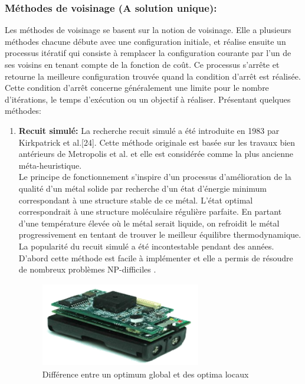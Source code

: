 \subsubsection{Méthodes de voisinage (A solution unique):}
Les méthodes de voisinage se basent sur la notion de voisinage. Elle a plusieurs méthodes chacune débute avec une configuration initiale, et réalise ensuite un processus itératif qui consiste à remplacer la configuration courante par l'un de ses voisins en tenant compte de la fonction de coût. Ce processus s'arrête et retourne la meilleure configuration trouvée quand la condition d'arrêt est réalisée. Cette condition d'arrêt concerne généralement une limite pour le nombre d'itérations, le temps d’exécution ou un objectif à réaliser. Présentant quelques méthodes:

\begin{enumerate}[label=\alph*)]
	\item \textbf{Recuit simulé: } La recherche recuit simulé a été introduite en 1983 par Kirkpatrick et al.[24]. Cette méthode originale est basée sur les travaux bien antérieurs de Metropolis et al. \cite{metropolis1953equation} et elle est considérée comme la plus ancienne méta-heuristique.\\
Le principe de fonctionnement s’inspire d’un processus d’amélioration de la qualité d’un métal solide par recherche d’un état d’énergie minimum correspondant à une structure stable de ce métal. L’état optimal correspondrait à une structure moléculaire régulière parfaite. En partant d’une température élevée où le métal serait liquide, on refroidit le métal progressivement en tentant de trouver le meilleur équilibre thermodynamique.\\
La popularité du recuit simulé a été incontestable pendant des années. D’abord cette méthode est facile à implémenter et elle a permis de résoudre de nombreux problèmes NP-difficiles \cite{bonomi1984n,vidal1993applied}.

\begin{figure}[h]
	\centering
	\includegraphics[width=7cm,height=3.7cm]{Chap1/1.png}
	\caption{Différence entre un optimum global et des optima locaux}
	\label{fig:CSF}
\end{figure}


\end{enumerate}
